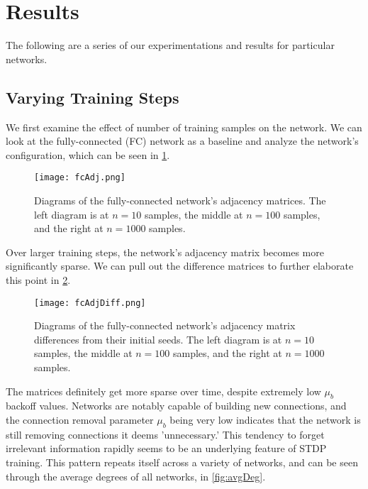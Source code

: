 \section{Results} \label{sec:Results}

The following are a series of our experimentations and results for particular
networks.

\subsection{Varying Training Steps}

We first examine the effect of number of training samples on the network. We can
look at the fully-connected (FC) network as a baseline and analyze the network's
configuration, which can be seen in \ref{fig:fcAdj}.

\begin{figure}[h]
    \centering
    \texttt{[image: fcAdj.png]}
    \caption{
        Diagrams of the fully-connected network's adjacency matrices. The left
        diagram is at $n=10$ samples, the middle at $n=100$ samples, and the
        right at $n=1000$ samples.
    }
    \label{fig:fcAdj}
\end{figure}

Over larger training steps, the network's adjacency matrix becomes more
significantly sparse. We can pull out the difference matrices to further
elaborate this point in \ref{fig:fcAdjDiff}.

\begin{figure}[h]
    \centering
    \texttt{[image: fcAdjDiff.png]}
    \caption{
        Diagrams of the fully-connected network's adjacency matrix differences
        from their initial seeds. The left diagram is at $n=10$ samples, the
        middle at $n=100$ samples, and the right at $n=1000$ samples.
    }
    \label{fig:fcAdjDiff}
\end{figure}

The matrices definitely get more sparse over time, despite extremely low $\mu_b$
backoff values. Networks are notably capable of building new connections, and
the connection removal parameter $\mu_b$ being very low indicates that the
network is still removing connections it deems 'unnecessary.' This tendency to
forget irrelevant information rapidly seems to be an underlying feature of STDP
training. This pattern repeats itself across a variety of networks, and can be
seen through the average degrees of all networks, in \ref{fig:avgDeg}.

